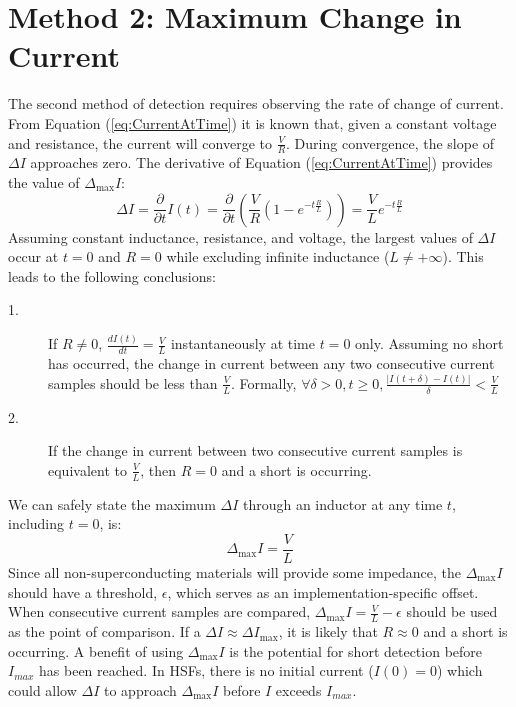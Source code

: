 \documentclass[11pt,oneside]{report}
\begin{document}
    \section*{Method 2: Maximum Change in Current}
    The second method of detection requires observing the rate of change of current. From Equation (\ref{eq:CurrentAtTime}) it is known that, given a constant voltage and resistance, the current will converge to $\frac{V}{R}$. During convergence, the slope of $\Delta I$ approaches zero. The derivative of Equation (\ref{eq:CurrentAtTime}) provides the value of $\Delta_{\max}I$:
    \begin{equation}
    \Delta I = \frac{\partial}{\partial t}I(t) = \frac{\partial}{\partial t}(\frac{V}{R}(1-e^{-t \frac{R}{L}})) = \frac{V}{L}e^{-t \frac{R}{L}}
    \end{equation}
    Assuming constant inductance, resistance, and voltage, the largest values of $\Delta I$ occur at $t = 0$ and $R = 0$ while excluding infinite inductance ($L \neq +\infty$). This leads to the following conclusions:
    \begin{description}
    \item [1.] If $R \neq 0$, $\frac{dI(t)}{dt} = \frac{V}{L}$ instantaneously at time $t = 0$ only. Assuming no short has occurred, the change in current between any two consecutive current samples should be less than $\frac{V}{L}$. Formally, $\forall \delta > 0, t \geq 0, \frac{|I(t+\delta) - I(t)|}{\delta} < \frac{V}{L}$ 
    \item [2.] If the change in current between two consecutive current samples is equivalent to $\frac{V}{L}$, then $R = 0$ and a short is occurring.
    \end{description}
    
    We can safely state the maximum $\Delta I$ through an inductor at any time $t$, including $t = 0$, is:
    \begin{equation}\label{eq:DeltaMax}
    \Delta_{\max}I = \frac{V}{L} \nonumber
    \end{equation}
    Since all non-superconducting materials will provide some impedance, the $\Delta_{\max}I$ should have a threshold, $\epsilon$, which serves as an implementation-specific offset. When consecutive current samples are compared, $\Delta_{\max} I = \frac{V}{L} - \epsilon$ should be used as the point of comparison. If a $\Delta I \approx \Delta I_{\max}$, it is likely that $R \approx 0$ and a short is occurring. A benefit of using $\Delta_{\max}I$ is the potential for short detection before $I_{max}$ has been reached. In HSFs, there is no initial current ($I(0) = 0$) which could allow $\Delta I$ to approach $\Delta_{\max}I$ before $I$ exceeds $I_{max}$.
\end{document}

